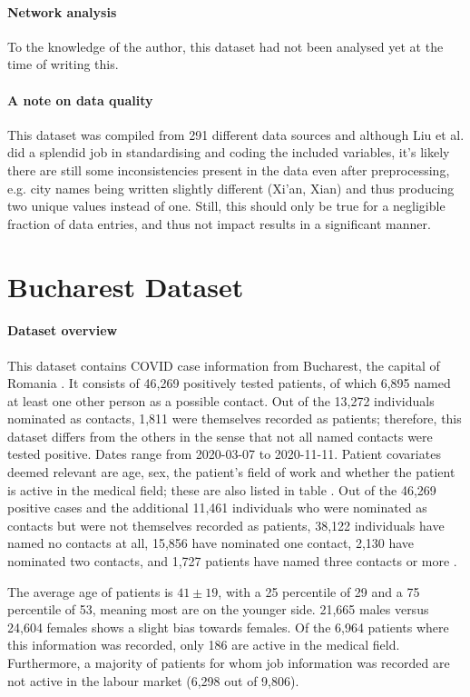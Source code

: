 \paragraph{Network analysis} To the knowledge of the author, this dataset had not been analysed yet at the time of writing this.

\paragraph{A note on data quality} This dataset was compiled from 291 different data sources and although Liu et al. did a splendid job in standardising and coding the included variables, it's likely there are still some inconsistencies present in the data even after preprocessing, e.g. city names being written slightly different (Xi'an, Xian) and thus producing two unique values instead of one. Still, this should only be true for a negligible fraction of data entries, and thus not impact results in a significant manner.

\section{Bucharest Dataset}
\label{sec:bucharest_dataset}

\paragraph{Dataset overview} This dataset contains COVID case information from Bucharest, the capital of Romania \cite{bucharest_data}. It consists of 46,269 positively tested patients, of which 6,895 named at least one other person as a possible contact. Out of the 13,272 individuals nominated as contacts, 1,811 were themselves recorded as patients; therefore, this dataset differs from the others in the sense that not all named contacts were tested positive. Dates range from 2020-03-07 to 2020-11-11. Patient covariates deemed relevant are age, sex, the patient's field of work and whether the patient is active in the medical field; these are also listed in table . Out of the 46,269 positive cases and the additional 11,461 individuals who were nominated as contacts but were not themselves recorded as patients, 38,122 individuals have named no contacts at all, 15,856 have nominated one contact, 2,130 have nominated two contacts, and 1,727 patients have named three contacts or more . 

The average age of patients is $41\pm19$, with a 25 percentile of 29 and a 75 percentile of 53, meaning most are on the younger side. 21,665 males versus 24,604 females shows a slight bias towards females. Of the 6,964 patients where this information was recorded, only 186 are active in the medical field. Furthermore, a majority of patients for whom job information was recorded are not active in the labour market (6,298 out of 9,806). 

